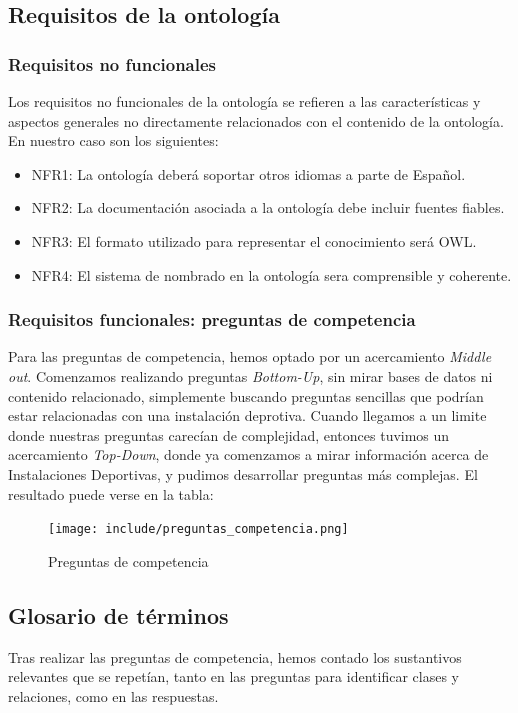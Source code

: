 \documentclass[a4paper,12pt]{article}
\begin{document}
	\subsection{Requisitos de la ontología}
	\subsubsection{Requisitos no funcionales}
	Los requisitos no funcionales de la ontología se refieren a las características y aspectos generales no directamente relacionados con el contenido de la ontología. En nuestro caso son los siguientes:
	\begin{itemize}
		\item NFR1: La ontología deberá soportar otros idiomas a parte de Español.
		\item NFR2: La documentación asociada a la ontología debe incluir fuentes fiables.
		\item NFR3: El formato utilizado para representar el conocimiento será OWL.
		\item NFR4: El sistema de nombrado en la ontología sera comprensible y coherente.
	\end{itemize}
	\subsubsection{Requisitos funcionales:  preguntas de competencia}
	Para las preguntas de competencia, hemos optado por un acercamiento \textit{Middle out}. Comenzamos realizando preguntas \textit{Bottom-Up}, sin mirar bases de datos ni contenido relacionado, simplemente buscando preguntas sencillas que podrían estar relacionadas con una instalación deprotiva. Cuando llegamos a un limite donde nuestras preguntas carecían de complejidad, entonces tuvimos un acercamiento \textit{Top-Down}, donde ya comenzamos a mirar información acerca de Instalaciones Deportivas, y pudimos desarrollar preguntas más complejas. El resultado puede verse en la tabla:
	\begin{figure}[H]
		\centering
		\texttt{[image: include/preguntas\_competencia.png]}
		\caption{Preguntas de competencia}
	\end{figure}
	
	\subsection{Glosario de términos}
	
	Tras realizar las preguntas de competencia, hemos contado los sustantivos relevantes que se repetían, tanto en las preguntas para identificar clases y relaciones, como en las respuestas. 
	
\end{document}
